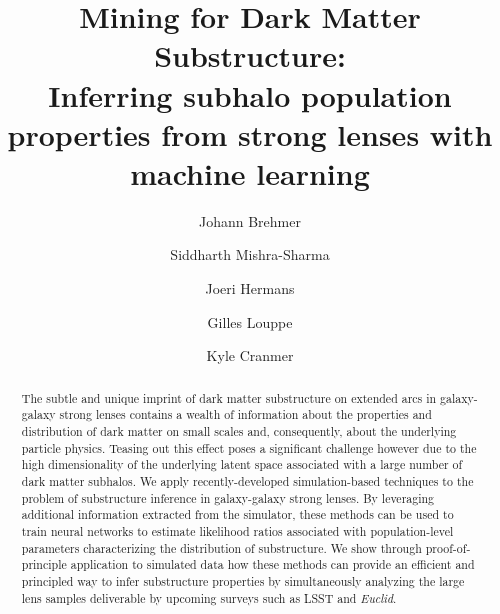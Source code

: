 \documentclass[twocolumn]{aastex62}
\begin{document}
\sloppy\sloppypar\raggedbottom\frenchspacing

\title{\textbf{%
Mining for Dark Matter Substructure: \\
Inferring subhalo population properties from strong lenses with machine learning
}}

\author{Johann Brehmer}

\author{Siddharth Mishra-Sharma}

\author{Joeri Hermans}

\author{Gilles Louppe}

\author{Kyle Cranmer}

\begin{abstract}\noindent
The subtle and unique imprint of dark matter substructure on extended arcs in galaxy-galaxy strong lenses contains a wealth of information about the properties and distribution of dark matter on small scales and, consequently, about the underlying particle physics. Teasing out this effect poses a significant challenge however due to the high dimensionality of the underlying latent space associated with a large number of dark matter subhalos. We apply recently-developed simulation-based techniques to the problem of substructure inference in galaxy-galaxy strong lenses. By leveraging additional information extracted from the simulator, these methods can be used to train neural networks to estimate likelihood ratios associated with population-level parameters characterizing the distribution of substructure. We show through proof-of-principle application to simulated data how these methods can provide an efficient and principled way to infer substructure properties by simultaneously analyzing the large lens samples deliverable by upcoming surveys such as LSST and \emph{Euclid}.
\end{abstract}
\end{document}
